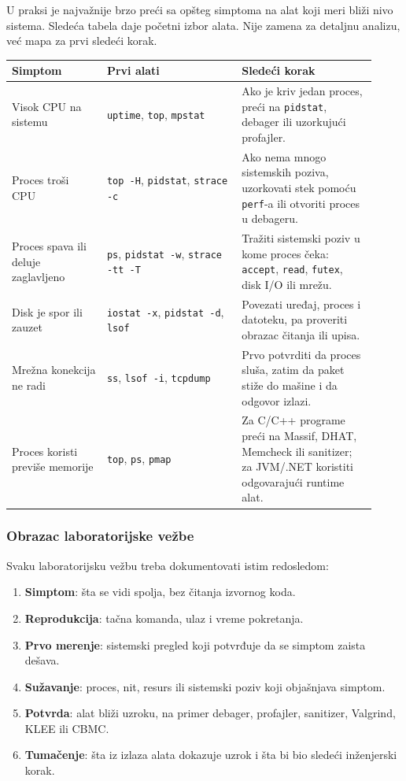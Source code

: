 U praksi je najvažnije brzo preći sa opšteg simptoma na alat koji meri bliži nivo sistema. Sledeća tabela daje početni izbor alata. Nije zamena za detaljnu analizu, već mapa za prvi sledeći korak.

\begin{longtable}{@{}p{0.24\linewidth}p{0.34\linewidth}p{0.34\linewidth}@{}}
\toprule
Simptom & Prvi alati & Sledeći korak \\
\midrule
\endhead
Visok CPU na sistemu & \texttt{uptime}, \texttt{top}, \texttt{mpstat} & Ako je kriv jedan proces, preći na \texttt{pidstat}, debager ili uzorkujući profajler. \\
Proces troši CPU & \texttt{top -H}, \texttt{pidstat}, \texttt{strace -c} & Ako nema mnogo sistemskih poziva, uzorkovati stek pomoću \texttt{perf}-a ili otvoriti proces u debageru. \\
Proces spava ili deluje zaglavljeno & \texttt{ps}, \texttt{pidstat -w}, \texttt{strace -tt -T} & Tražiti sistemski poziv u kome proces čeka: \texttt{accept}, \texttt{read}, \texttt{futex}, disk I/O ili mrežu. \\
Disk je spor ili zauzet & \texttt{iostat -x}, \texttt{pidstat -d}, \texttt{lsof} & Povezati uređaj, proces i datoteku, pa proveriti obrazac čitanja ili upisa. \\
Mrežna konekcija ne radi & \texttt{ss}, \texttt{lsof -i}, \texttt{tcpdump} & Prvo potvrditi da proces sluša, zatim da paket stiže do mašine i da odgovor izlazi. \\
Proces koristi previše memorije & \texttt{top}, \texttt{ps}, \texttt{pmap} & Za C/C++ programe preći na Massif, DHAT, Memcheck ili sanitizer; za JVM/.NET koristiti odgovarajući runtime alat. \\
\bottomrule
\end{longtable}

\subsubsection{Obrazac laboratorijske vežbe}\label{dijagnoziranje-obrazac-laboratorije}

Svaku laboratorijsku vežbu treba dokumentovati istim redosledom:

\begin{enumerate}
\tightlist
\item
  \textbf{Simptom}: šta se vidi spolja, bez čitanja izvornog koda.
\item
  \textbf{Reprodukcija}: tačna komanda, ulaz i vreme pokretanja.
\item
  \textbf{Prvo merenje}: sistemski pregled koji potvrđuje da se simptom zaista dešava.
\item
  \textbf{Sužavanje}: proces, nit, resurs ili sistemski poziv koji objašnjava simptom.
\item
  \textbf{Potvrda}: alat bliži uzroku, na primer debager, profajler, sanitizer, Valgrind, KLEE ili CBMC.
\item
  \textbf{Tumačenje}: šta iz izlaza alata dokazuje uzrok i šta bi bio sledeći inženjerski korak.
\end{enumerate}

